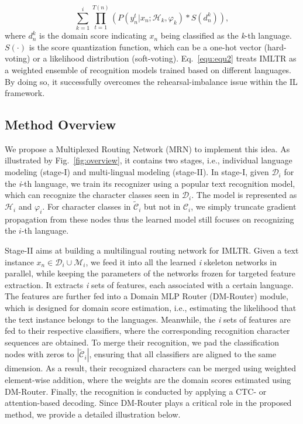 \documentclass[10pt,twocolumn,letterpaper]{article}
\begin{document}
\begin{equation}
\sum_{k=1}^{i}\prod_{t=1}^{T(n)}\left(P\left(y_{n}^{t} | x_{n} ; \mathcal{H}_{k}, \varphi_{k}\right) * S\left(d_{n}^{k} \right)\right),
\label{equ:equ2}
\end{equation}
where $d_{n}^{k}$ is the domain score indicating $x_{n}$ being classified as the \emph{k}-th language. $S(\cdot)$ is the score quantization function, which can be a one-hot vector (hard-voting) or a likelihood distribution (soft-voting). Eq.~\ref{equ:equ2} treats IMLTR as a weighted ensemble of recognition models trained based on different languages. By doing so, it successfully overcomes the rehearsal-imbalance issue within the IL framework. 


\subsection{Method Overview}
We propose a Multiplexed Routing Network (MRN) to implement this idea. As illustrated by Fig.~\ref{fig:overview}, it contains two stages, i.e., individual language modeling (stage-I) and multi-lingual modeling (stage-II). In stage-I, given $\mathcal{D}_{i}$ for the \emph{i}-th language, we train its recognizer using a popular text recognition model, which can recognize the character classes seen in $\mathcal{D}_{i}$. The model is represented as $\mathcal{H}_{i}$ and $\mathcal\varphi_{i}$. For character classes in $\tilde{\mathcal{C}}_{i}$ but not in $\mathcal{C}_{i}$, we simply truncate gradient propagation from these nodes thus the learned model still focuses on recognizing the $i$-th language.

Stage-II aims at building a multilingual routing network for IMLTR. Given a text instance $x_{n} \in \mathcal{D}_{i}\cup \mathcal{M}_i$, we feed it into all the learned \emph{i} skeleton networks in parallel, while keeping the parameters of the networks frozen for targeted feature extraction. It extracts \emph{i} sets of features, each associated with a certain language. The features are further fed into a Domain MLP Router (DM-Router) module, which is designed for domain score estimation, i.e., estimating the likelihood that the text instance belongs to the languages. Meanwhile, the \emph{i} sets of features are fed to their respective classifiers, where the corresponding recognition character sequences are obtained. To merge their recognition, we pad the classification nodes with zeros to $|\tilde{\mathcal{C}}_{i}|$, ensuring that all classifiers are aligned to the same dimension. As a result, their recognized characters can be merged using weighted element-wise addition, where the weights are the domain scores estimated using DM-Router. Finally, the recognition is conducted by applying a CTC- or attention-based decoding. Since DM-Router plays a critical role in the proposed method, we provide a detailed illustration below.
\end{document}
